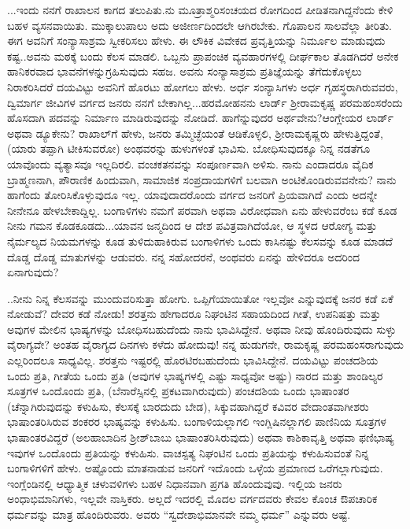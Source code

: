 ...ಇಂದು ನನಗೆ ರಾಖಾಲನ ಕಾಗದ ತಲುಪಿತು.\enginline{-}ನು ಮೂತ್ರಾಶ್ಮರಿಸಂಚಯದ ರೋಗದಿಂದ ಪೀಡಿತನಾಗಿದ್ದನೆಂದು ಕೇಳಿ ಬಹಳ ವ್ಯಸನವಾಯಿತು. ಮುಕ್ಕಾಲುಪಾಲು ಅದು ಅಜೀರ್ಣದಿಂದಲೇ ಆಗಿರಬೇಕು. ಗೊಪಾಲನ ಸಾಲವೆಲ್ಲಾ ತೀರಿತು. ಈಗ ಅವನಿಗೆ ಸಂನ್ಯಾಸಾಶ್ರಮ ಸ್ವೀಕರಿಸಲು ಹೇಳು. ಈ ಲೌಕಿಕ ವಿವೇಕದ ಪ್ರವೃತ್ತಿಯನ್ನು ನಿರ್ಮೂಲ ಮಾಡುವುದು ಕಷ್ಟ..ಅವನು ಮಠಕ್ಕೆ ಬಂದು ಕೆಲಸ ಮಾಡಲಿ. ಒಬ್ಬನು ಪ್ರಾಪಂಚಿಕ ವ್ಯವಹಾರಗಳಲ್ಲಿ ದೀರ್ಘಕಾಲ ತೊಡಗಿದರೆ ಅನೇಕ ಹಾನಿಕರವಾದ ಭಾವನೆಗಳನ್ನು\break ಗ್ರಹಿಸುವುದು ಸಹಜ. ಅವನು ಸಂನ್ಯಾಸಾಶ್ರಮ ಪ್ರತಿಜ್ಞೆಯನ್ನು ತೆಗೆದುಕೊಳ್ಳಲು ನಿರಾಕರಿಸಿದರೆ ದಯವಿಟ್ಟು ಅವನಿಗೆ ಹೊರಟು ಹೋಗಲು ಹೇಳು. ಅರ್ಧ ಸಂನ್ಯಾಸಿಗಳು ಅರ್ಧ ಗೃಹಸ್ಥರಾಗಿರುವವರು, ದ್ವಿಮಾರ್ಗ ಜೀವಿಗಳ ವರ್ಗದ ಜನರು ನನಗೆ ಬೇಕಾಗಿಲ್ಲ...ಹರ\break ಮೋಹನನು ಲಾರ್ಡ್ ಶ‍್ರೀರಾಮಕೃಷ್ಣ ಪರಮಹಂಸರೆಂದು ಹೊಸದಾಗಿ ಪದವನ್ನು ನಿರ್ಮಾಣ ಮಾಡಿರುವುದನ್ನು ನೋಡಿದೆ. ಹಾಗೆನ್ನುವುದರ ಅರ್ಥವೇನು?ಆಂಗ್ಲೇಯರ ಲಾರ್ಡ್ ಅಥವಾ ಡ್ಯೂಕೇನು? ರಾಖಾಲ್‌ಗೆ ಹೇಳು, ಜನರು ತಮ್ಮಿಚ್ಛೆಯಂತೆ ಆಡಿಕೊಳ್ಳಲಿ, ಶ‍್ರೀರಾಮಕೃಷ್ಣರು ಹೇಳುತ್ತಿದ್ದಂತೆ, (ಯಾರು ತಪ್ಪಾಗಿ ಟೀಕಿಸುವರೋ) ಅಂಥವರನ್ನು ಹುಳುಗಳಂತೆ ಭಾವಿಸು. ಬೋಧಿಸುವುದಕ್ಕೂ ನಿನ್ನ ನಡತೆಗೂ ಯಾವೊಂದು ವ್ಯತ್ಯಾಸವೂ ಇಲ್ಲದಿರಲಿ. ವಂಚಕತನವನ್ನು ಸಂಪೂರ್ಣವಾಗಿ ಅಳಿಸು. ನಾನು ಎಂದಾದರೂ ವೈದಿಕ ಬ್ರಾಹ್ಮಣನಾಗಿ, ಪೌರಾಣಿಕ ಹಿಂದುವಾಗಿ, ಸಾಮಾಜಿಕ ಸಂಪ್ರದಾಯಗಳಿಗೆ ಬಲವಾಗಿ ಅಂಟಿಕೊಂಡಿರುವವನೇನು? ನಾನು ಹಾಗೆಂದು ತೋರಿಸಿಕೊಳ್ಳುವುದೂ ಇಲ್ಲ. ಯಾವುದಾದರೊಂದು ವರ್ಗದ ಜನರಿಗೆ ಪ್ರಿಯವಾಗಿದೆ ಎಂದು ಅದನ್ನೇ ನೀನೇನೂ ಹೇಳಬೇಕಾದ್ದಿಲ್ಲ. ಬಂಗಾಳಿಗಳು ನಮಗೆ ಪರವಾಗಿ ಅಥವಾ ವಿರೋಧವಾಗಿ ಏನು ಹೇಳುವರೆಂಬ ಕಡೆ ಕೂಡ ನೀನು ಗಮನ ಕೊಡಕೂಡದು...ಯಾವನ ಜನ್ಮದಿಂದ ಆ ದೇಶ ಪವಿತ್ರವಾಗಿದೆಯೋ, ಆ ಸ್ಥಳದ ಆರೋಗ್ಯ ಮತ್ತು ನೈರ್ಮಲ್ಯದ ನಿಯಮಗಳನ್ನು ಕೂಡ ತುಳಿದುಹಾಕಿರುವ ಬಂಗಾಳಿಗಳು ಒಂದು ಕಾಸಿನಷ್ಟು ಕೆಲಸವನ್ನು ಕೂಡ ಮಾಡದೆ ದೊಡ್ಡ ದೊಡ್ಡ ಮಾತುಗಳನ್ನು ಆಡುವರು. ನನ್ನ ಸಹೋದರನೆ, ಅಂಥವರು ಏನನ್ನು ಹೇಳಿದರೂ ಅದರಿಂದ ಏನಾಗುವುದು?

..ನೀನು ನಿನ್ನ ಕೆಲಸವನ್ನು ಮುಂದುವರಿಸುತ್ತಾ ಹೋಗು. ಒಪ್ಪಿಗೆಯಾಯಿತೋ ಇಲ್ಲವೋ ಎನ್ನುವುದಕ್ಕೆ ಜನರ ಕಡೆ ಏಕೆ ನೋಡುವೆ? ದೇವರ ಕಡೆ ನೋಡು! ಶರತ್ತನು ಹೇಗಾದರೂ ನಿಘಂಟಿನ ಸಹಾಯದಿಂದ ಗೀತೆ, ಉಪನಿಷತ್ತು ಮತ್ತು ಅವುಗಳ ಮೇಲಿನ ಭಾಷ್ಯಗಳನ್ನು ಬೋಧಿಸಬಹುದೆಂದು ನಾನು ಭಾವಿಸಿದ್ದೇನೆ. ಅಥವಾ ನೀವು ಹೊಂದಿರುವುದು ಸುಳ್ಳು ವೈರಾಗ್ಯವೇ? ಅಂತಹ ವೈರಾಗ್ಯದ ದಿನಗಳು ಕಳೆದು ಹೋದುವು! ನನ್ನ ಹುಡುಗನೇ, ರಾಮಕೃಷ್ಣ ಪರಮಹಂಸರಾಗುವುದು ಎಲ್ಲರಿಂದಲೂ ಸಾಧ್ಯವಿಲ್ಲ. ಶರತ್ತನು ಇಷ್ಟರಲ್ಲಿ ಹೊರಟಿರಬಹುದೆಂದು ಭಾವಿಸಿದ್ದೇನೆ. ದಯವಿಟ್ಟು ಪಂಚದಶಿಯ ಒಂದು ಪ್ರತಿ, ಗೀತೆಯ ಒಂದು ಪ್ರತಿ (ಅವುಗಳ ಭಾಷ್ಯಗಳಲ್ಲಿ ಎಷ್ಟು ಸಾಧ್ಯವೋ ಅಷ್ಟು) ನಾರದ ಮತ್ತು ಶಾಂಡಿಲ್ಯರ ಸೂತ್ರಗಳ ಒಂದೊಂದು ಪ್ರತಿ, (ಬೆನಾರೆಸ್ಸಿನಲ್ಲಿ ಪ್ರಕಟವಾಗಿರುವುದು) ಪಂಚದಶಿಯ ಒಂದು ಭಾಷಾಂತರ (ಚೆನ್ನಾಗಿರುವುದನ್ನು ಕಳುಹಿಸು, ಕೆಲಸಕ್ಕೆ ಬಾರದುದು ಬೇಡ), ಸಿಕ್ಕುವಹಾಗಿದ್ದರೆ ಕವಿವರ ವೇದಾಂತವಾಗೀಶರು ಭಾಷಾಂತರಿಸಿರುವ ಶಂಕರರ ಭಾಷ್ಯವನ್ನು ಕಳುಹಿಸು. ಬಂಗಾಳಿಯಲ್ಲಾಗಲಿ ಇಂಗ್ಲಿಷಿನಲ್ಲಾಗಲಿ ಪಾಣಿನಿಯ ಸೂತ್ರಗಳ ಭಾಷಾಂತರವಿದ್ದರೆ (ಅಲಹಾಬಾದಿನ ಶ‍್ರೀಶ್‌ಬಾಬು ಭಾಷಾಂತರಿಸಿರುವುದು) ಅಥವಾ ಕಾಶಿಕಾವೃತ್ತಿ ಅಥವಾ ಫಣಿಭಾಷ್ಯ ಇವುಗಳ ಒಂದೊಂದು ಪ್ರತಿಯನ್ನು ಕಳುಹಿಸು. ವಾಚಸ್ಪತ್ಯ ನಿಘಂಟಿನ ಒಂದು ಪ್ರತಿಯನ್ನು ಕಳುಹಿಸುವಂತೆ ನಿನ್ನ ಬಂಗಾಳಿಗಳಿಗೆ ಹೇಳು. ಅಷ್ಟೊಂದು ಮಾತನಾಡುವ ಜನರಿಗೆ ಇದೊಂದು ಒಳ್ಳೆಯ ಪ್ರಮಾಣದ ಒರೆಗಲ್ಲಾಗುವುದು. ಇಂಗ್ಲೆಂಡಿನಲ್ಲಿ ಆಧ್ಯಾತ್ಮಿಕ ಚಳುವಳಿಗಳು ಬಹಳ ನಿಧಾನವಾಗಿ ಪ್ರಗತಿ ಹೊಂದುವುವು. ಇಲ್ಲಿಯ ಜನರು ಅಂಧಾಭಿಮಾನಿಗಳು, ಇಲ್ಲವೇ ನಾಸ್ತಿಕರು. ಅಲ್ಲದೆ ಇದರಲ್ಲಿ ಮೊದಲ ವರ್ಗದವರು ಕೇವಲ ಕೊಂಚ ಔಪಚಾರಿಕ ಧರ್ಮವನ್ನು ಮಾತ್ರ ಹೊಂದಿರುವರು. ಅವರು ``ಸ್ವದೇಶಾಭಿಮಾನವೇ ನಮ್ಮ ಧರ್ಮ'' ಎನ್ನುವರು ಅಷ್ಟೆ.

